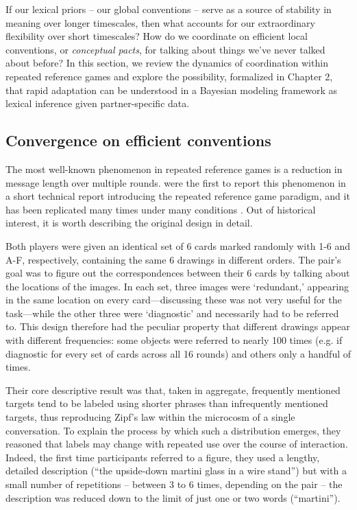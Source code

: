 If our lexical priors -- our global conventions -- serve as a source of stability in meaning over longer timescales, then what accounts for our extraordinary flexibility  over short timescales? How do we coordinate on efficient local conventions, or \emph{conceptual pacts}, for talking about things we've never talked about before? In this section, we review the dynamics of coordination within repeated reference games and explore the possibility, formalized in Chapter 2, that rapid adaptation can be understood in a Bayesian modeling framework as lexical inference given partner-specific data.%

\subsection{Convergence on efficient conventions}

The most well-known phenomenon in repeated reference games is a reduction in message length over multiple rounds.  were the first to report this phenomenon in a short technical report introducing the repeated reference game paradigm, and it has been replicated many times under many conditions \cite<most notably by>[in a much more streamlined experimental design using tangram shapes]{ClarkWilkesGibbs86_ReferringCollaborative}. Out of historical interest, it is worth describing the original design in detail. 

Both players were given an identical set of 6 cards marked randomly with 1-6 and A-F, respectively, containing the same 6 drawings in different orders. The pair's goal was to figure out the correspondences between their 6 cards by talking about the locations of the images. In each set, three images were `redundant,' appearing in the same location on every card---discussing these was not very useful for the task---while the other three were `diagnostic' and necessarily had to be referred to. This design therefore had the peculiar property that different drawings appear with different frequencies: some objects were referred to nearly 100 times (e.g. if diagnostic for every set of cards across all 16 rounds) and others only a handful of times. 

Their core descriptive result was that, taken in aggregate, frequently mentioned targets tend to be labeled using shorter phrases than infrequently mentioned targets, thus reproducing Zipf's law within the microcosm of a single conversation. To explain the process by which such a distribution emerges, they reasoned that labels may change with repeated use over the course of interaction. Indeed, the first time participants referred to a figure, they used a lengthy, detailed description (``the upside-down martini glass in a wire stand'') but with a small number of repetitions -- between 3 to 6 times, depending on the pair -- the description was reduced down to the limit of just one or two words (``martini''). 

